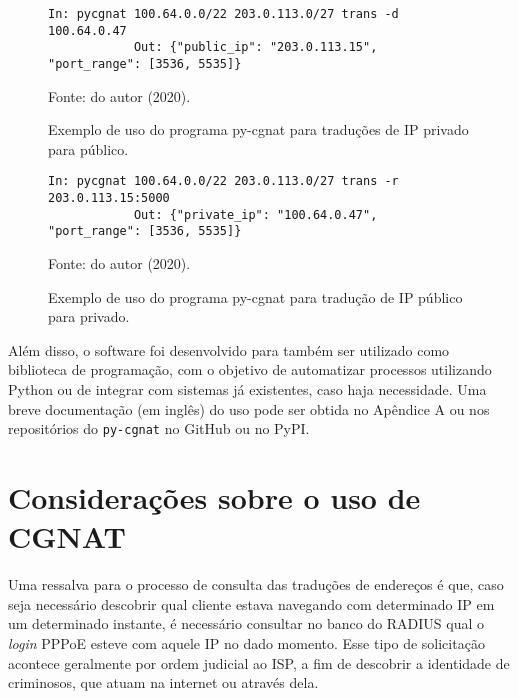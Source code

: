         \begin{figure}[!htb]
        \centering
        \caption{Exemplo de uso do programa py-cgnat para traduções de IP privado para público.} 
        \label{fig:pycgnat_transd}
        
        \begin{Verbatim}[fontsize=\small]
            In: pycgnat 100.64.0.0/22 203.0.113.0/27 trans -d 100.64.0.47
            Out: {"public_ip": "203.0.113.15", "port_range": [3536, 5535]}
        \end{Verbatim} 

        {\small Fonte: do autor (2020).} 
    \end{figure}
    
     \begin{figure}[!htb]
        \centering
        \caption{Exemplo de uso do programa py-cgnat para tradução de IP público para privado.} 
        \label{fig:pycgnat_transr}
        
        \begin{Verbatim}[fontsize=\small]
            In: pycgnat 100.64.0.0/22 203.0.113.0/27 trans -r 203.0.113.15:5000
            Out: {"private_ip": "100.64.0.47", "port_range": [3536, 5535]}
        \end{Verbatim} 

        {\small Fonte: do autor (2020).} 
    \end{figure}
    
    Além disso, o software foi desenvolvido para também ser utilizado como biblioteca de programação, com o objetivo de automatizar processos utilizando Python ou de integrar com sistemas já existentes, caso haja necessidade. Uma breve documentação (em inglês) do uso pode ser obtida no Apêndice A ou nos repositórios do {\tt py-cgnat} no GitHub ou no PyPI.
 
\section{Considerações sobre o uso de CGNAT}
    
    Uma ressalva para o processo de consulta das traduções de endereços é que, caso seja necessário descobrir qual cliente estava navegando com determinado IP em um determinado instante, é necessário consultar no banco do RADIUS qual o \textit{login} PPPoE esteve com aquele IP no dado momento. Esse tipo de solicitação acontece geralmente por ordem judicial ao ISP, a fim de descobrir a identidade de criminosos, que atuam na internet ou através dela.
    
